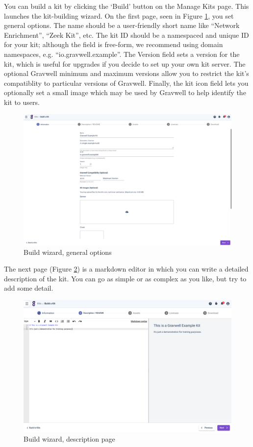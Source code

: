 You can build a kit by clicking the `Build' button on the Manage Kits page. This launches the kit-building wizard. On the first page, seen in Figure \ref{fig:buildwizard1}, you set general options. The name should be a user-friendly short name like ``Network Enrichment'', ``Zeek Kit'', etc. The kit ID should be a namespaced and unique ID for your kit; although the field is free-form, we recommend using domain namespaces, e.g. ``io.gravwell.example''. The Version field sets a version for the kit, which is useful for upgrades if you decide to set up your own kit server. The optional Gravwell minimum and maximum versions allow you to restrict the kit's compatiblity to particular versions of Gravwell. Finally, the kit icon field lets you optionally set a small image which may be used by Gravwell to help identify the kit to users.

\begin{figure}[H]
	\includegraphics[width=0.8\linewidth]{images/buildwizard1.png}
	\caption{Build wizard, general options}
	\label{fig:buildwizard1}
\end{figure}

The next page (Figure \ref{fig:buildwizard2}) is a markdown editor in which you can write a detailed description of the kit. You can go as simple or as complex as you like, but try to add some detail. 

\begin{figure}[H]
	\includegraphics[width=0.8\linewidth]{images/buildwizard2.png}
	\caption{Build wizard, description page}
	\label{fig:buildwizard2}
\end{figure}

